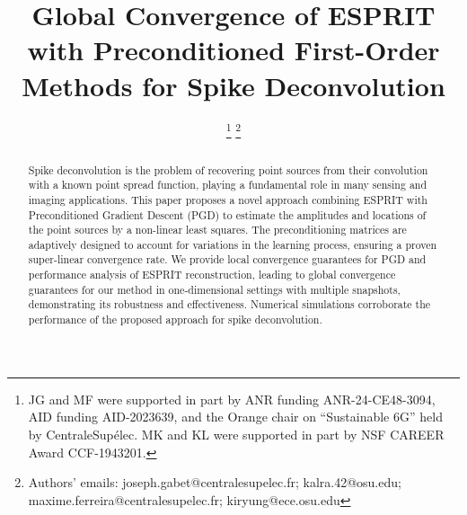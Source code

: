 \documentclass[conference,english]{IEEEtran}
\begin{document}
\title{Global Convergence of ESPRIT with Preconditioned First-Order Methods for Spike Deconvolution}

\IEEEoverridecommandlockouts


\author{
  \thanks{
    JG and MF were supported in part by ANR funding ANR-24-CE48-3094, AID funding AID-2023639, and the Orange chair on ``Sustainable 6G'' held by CentraleSupélec. MK and KL were supported in part by NSF CAREER Award CCF-1943201.
    }
    \thanks{Authors' emails: joseph.gabet@centralesupelec.fr; kalra.42@osu.edu; maxime.ferreira@centralesupelec.fr; kiryung@ece.osu.edu}
}

\maketitle

\begin{abstract}
Spike deconvolution is the problem of recovering point sources from their convolution with a known point spread function, playing a fundamental role in many sensing and imaging applications. This paper proposes a novel approach combining ESPRIT with Preconditioned Gradient Descent (PGD) to estimate the amplitudes and locations of the point sources by a non-linear least squares. The preconditioning matrices are adaptively designed to account for variations in the learning process, ensuring a proven super-linear convergence rate.
We provide local convergence guarantees for PGD and performance analysis of ESPRIT reconstruction, leading to global convergence guarantees for our method in one-dimensional settings with multiple snapshots, demonstrating its robustness and effectiveness. Numerical simulations corroborate the performance of the proposed approach for spike deconvolution.
\end{abstract}
\end{document}
